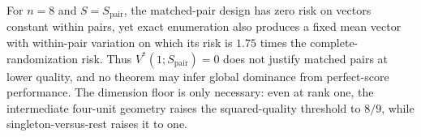 For \(n=8\) and \(S=S_{\mathrm{pair}}\), the matched-pair design has zero risk on vectors constant within pairs, yet exact enumeration also produces a fixed mean vector with within-pair variation on which its risk is \(1.75\) times the complete-randomization risk. Thus \(V^*(1;S_{\mathrm{pair}})=0\) does not justify matched pairs at lower quality, and no theorem may infer global dominance from perfect-score performance. The dimension floor is only necessary: even at rank one, the intermediate four-unit geometry raises the squared-quality threshold to \(8/9\), while singleton-versus-rest raises it to one.